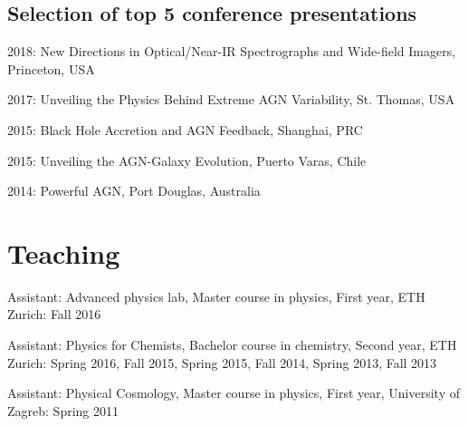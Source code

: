 \documentclass[11pt,letterpaper]{article}
\renewenvironment{itemize}{
  \begin{list}{}{
    \setlength{\leftmargin}{1.5em}
    \setlength{\itemsep}{0.10em}
    \setlength{\parskip}{0pt}
    \setlength{\parsep}{0.10em}
  }
}{
  \end{list}
}
\begin{document}
\subsection*{Selection of top 5  conference presentations}
\begin{itemize}
\item 2018:  New Directions in Optical/Near-IR Spectrographs and Wide-field Imagers, Princeton, USA 
\item 2017: Unveiling the Physics Behind Extreme AGN Variability, St. Thomas, USA 

\item 2015:
Black Hole Accretion and AGN Feedback, Shanghai, PRC
\item 2015: Unveiling the AGN-Galaxy Evolution, Puerto Varas, Chile 
\item 2014:
 Powerful AGN, Port Douglas, Australia 
\end{itemize}

\section*{Teaching}

\begin{itemize}
\item Assistant: Advanced physics lab, Master course in physics, First year, ETH Zurich: Fall 2016
\item Assistant: Physics for Chemists, Bachelor course in chemistry, Second year, ETH Zurich: Spring 2016, Fall 2015, Spring 2015, Fall 2014, Spring 2013, Fall 2013
\item Assistant: Physical Cosmology, Master course in physics, First year, University of Zagreb: Spring 2011 
\end{itemize}
\end{document}
